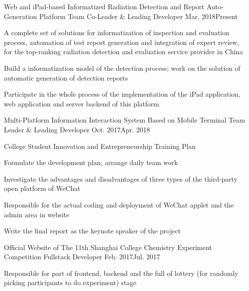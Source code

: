 
\begin{projitem}
    {Web and iPad-based Informatized Radiation Detection and Report Auto-Generation Platform}
    {Team Co-Leader \& Leading Developer}
    {Mar. 2018}{Present}
    \item A complete set of solutions for informatization of inspection
          and evaluation process, automation of test report generation and
          integration of expert review, for the top-ranking radiation detection
          and evaluation service provider in China
    \item Build a informatization model of the detection process;
          work on the solution of automatic generation of detection reports
    \item Participate in the whole process of the implementation of the iPad application, web application and server backend of this platform
\end{projitem}

\begin{projitem}
    {Multi-Platform Information Interaction System Based on Mobile Terminal}
    {Team Leader \& Leading Developer}
    {Oct. 2017}{Apr. 2018}
    \item College Student Innovation and Entrepreneurship Training Plan
    \item Formulate the development plan; arrange daily team work
    \item Investigate the advantages and disadvantages of three types of the third-party open platform of WeChat
    \item Responsible for the actual coding and deployment of WeChat applet and the admin area in website
    \item Write the final report as the keynote speaker of the project
\end{projitem}

\begin{projitem}
    {Official Website of The 11th Shanghai College Chemistry Experiment Competition}
    {Fullstack Developer}
    {Feb. 2017}{Jul. 2017}
    \item Responsible for part of frontend, backend and the full of lottery (for randomly picking participants to do experiment) stage
\end{projitem}

\endinput